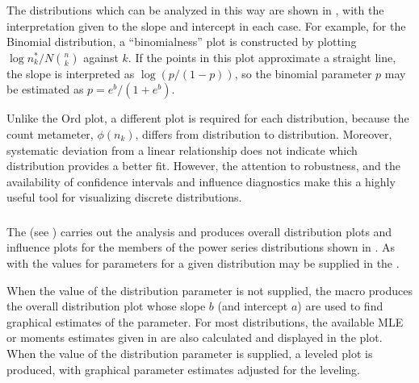 The distributions which can be analyzed in this way are shown in
, with the interpretation given to the
slope and intercept in each case.
For example, for the Binomial distribution, a ``binomialness''
plot is constructed by plotting $\log n_k^{*} / N \binom{n}{k}$
against $k$.  If the points in this plot approximate a straight
line, the slope is interpreted as $\log (p/(1-p))$, so the
binomial parameter $p$ may be estimated as $p = e^b/(1+e^b)$.


Unlike the Ord plot, a different plot is required for each distribution,
because the count metameter, \(\phi ( n_k )\), differs
from distribution to distribution.
Moreover, systematic deviation from a linear relationship does not
       indicate which distribution provides a better fit.
However, the attention to robustness, and the availability of confidence
intervals and influence diagnostics make this a highly useful tool
for visualizing discrete distributions.


\subsubsection{}
The  (see ) carries out the analysis and produces overall
distribution plots and influence plots for the members of the
power series distributions shown in .
As with the  values for parameters for a given distribution
may be supplied
in the .

When the value of the distribution parameter
is not supplied, the macro produces the overall distribution plot
whose slope $b$ (and intercept $a$) are used to find graphical
estimates of the parameter.
For most distributions, the available MLE or moments estimates
given in 
are also calculated and displayed in the plot.
When the value of the distribution parameter is supplied,
a leveled plot is produced, with graphical parameter estimates adjusted
for the leveling.

